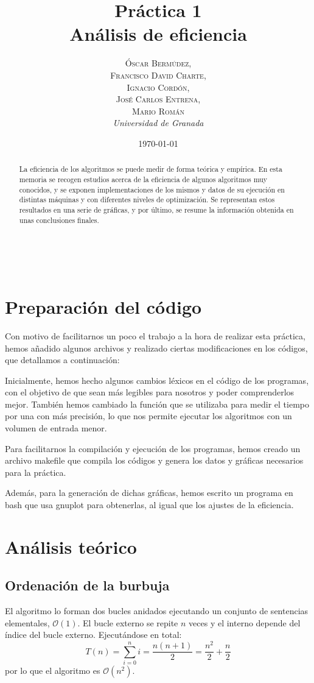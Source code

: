 \documentclass[a4paper, 11pt]{article} %
\title{\textbf{Práctica 1}\\ %
Análisis de eficiencia} %
\author{\textsc{Óscar Bermúdez,\\Francisco David Charte,\\Ignacio Cordón,\\José Carlos Entrena,\\Mario Román} %
\\{\textit{Universidad de Granada}}} %
\date{\today} %
\makeatletter
\renewcommand{\maketitle}{ %
\begin{flushright} %
{\LARGE\@title} %

\vspace{50pt} %

{\large\@author} %
\\\@date %

\vspace{40pt} %
\end{flushright}
}
\makeatother
\begin{document}
\maketitle %

\renewcommand{\abstractname}{Resumen} %
\begin{abstract}
La eficiencia de los algoritmos se puede medir de forma teórica 
y empírica. En esta memoria se recogen estudios acerca de la 
eficiencia de algunos algoritmos muy conocidos, y se exponen 
implementaciones de los mismos y datos de su ejecución en 
distintas máquinas y con diferentes niveles de optimización.
Se representan estos resultados en una serie de gráficas, y por 
último, se resume la información obtenida en unas conclusiones 
finales.
\end{abstract}
\tableofcontents

\pagebreak

\section {Preparación del código}
Con motivo de facilitarnos un poco el trabajo a la hora de realizar esta práctica,
hemos añadido algunos archivos y realizado ciertas modificaciones en los códigos, que
detallamos a continuación: 

\medskip
Inicialmente, hemos hecho algunos cambios léxicos en el código de los programas, con el
objetivo de que sean más legibles para nosotros y poder comprenderlos mejor. También hemos
cambiado la función que se utilizaba para medir el tiempo por una con más precisión, lo 
que nos permite ejecutar los algoritmos con un volumen de entrada menor. 

Para facilitarnos la compilación y ejecución de los programas, hemos creado un archivo 
makefile que compila los códigos y genera los datos y gráficas necesarios para la práctica.

Además, para la generación de dichas gráficas, hemos escrito un programa en bash que usa gnuplot 
para obtenerlas, al igual que los ajustes de la eficiencia. 

\section {Análisis teórico}
\subsection {Ordenación de la burbuja}
El algoritmo lo forman dos bucles anidados ejecutando un conjunto de sentencias elementales, $\mathcal{O}(1)$.
El bucle externo se repite $n$ veces y el interno depende del índice del bucle externo. Ejecutándose en total:
\begin{equation}
 T(n) = \sum_{i=0}^n i = \frac{n(n+1)}{2} = \frac{n^2}{2} + \frac{n}{2}
\end{equation}
por lo que el algoritmo es $\mathcal{O}(n^2)$.
\end{document}

